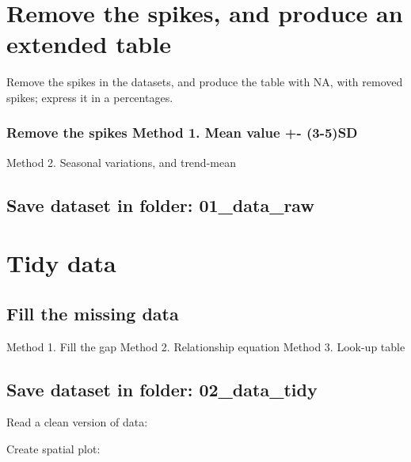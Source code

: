 \documentclass[
]{agujournal2019}
\begin{document}
\section{Remove the spikes, and produce an extended
table}\label{remove-the-spikes-and-produce-an-extended-table-1}

Remove the spikes in the datasets, and produce the table with NA, with
removed spikes; express it in a percentages.

\subsubsection{Remove the spikes Method 1. Mean value +-
(3-5)SD}\label{remove-the-spikes-method-1.-mean-value---3-5sd}

Method 2. Seasonal variations, and trend-mean

\subsection{Save dataset in folder:
01\_data\_raw}\label{save-dataset-in-folder-01_data_raw-1}

\section{Tidy data}\label{tidy-data-1}

\subsection{Fill the missing data}\label{fill-the-missing-data-1}

Method 1. Fill the gap Method 2. Relationship equation Method 3. Look-up
table

\subsection{Save dataset in folder:
02\_data\_tidy}\label{save-dataset-in-folder-02_data_tidy-1}

Read a clean version of data:

Create spatial plot:
\end{document}
